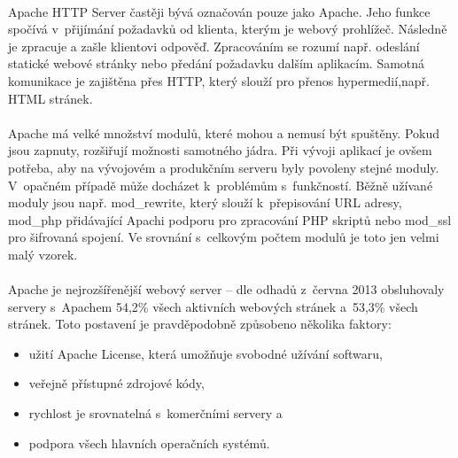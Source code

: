 \documentclass[11pt,a4paper,titlepage,oneside]{book}
\begin{document}


		\paragraph{} Apache HTTP Server častěji bývá označován pouze jako Apache. Jeho funkce spočívá v~přijímání požadavků od klienta, kterým je webový prohlížeč. Následně je zpracuje a zašle klientovi odpověď. Zpracováním se rozumí např. odeslání statické webové stránky nebo předání požadavku dalším aplikacím. Samotná komunikace je zajištěna přes \ac{HTTP}, který slouží pro přenos hypermedií\cite{rfc2616},např. \ac{HTML} stránek.
		\paragraph{}Apache má velké množství modulů, které mohou a nemusí být spuštěny. Pokud jsou zapnuty, rozšiřují možnosti samotného jádra. Při vývoji aplikací je ovšem potřeba, aby na vývojovém a produkčním serveru byly povoleny stejné moduly. V~opačném případě může docházet k~problémům s~funkčností. Běžně užívané moduly jsou např. mod\_rewrite, který slouží k~přepisování URL adresy, mod\_php přidávající Apachi podporu pro zpracování PHP skriptů nebo mod\_ssl pro šifrovaná spojení. Ve srovnání s~celkovým počtem modulů je toto jen velmi malý vzorek.



		\paragraph{}\label{sec:marketShare} Apache je nejrozšířenější webový server -- dle odhadů\cite{netcraft_survey} z~června 2013 obsluhovaly servery s~Apachem 54,2\% všech aktivních webových stránek a~53,3\% všech stránek. Toto postavení je pravděpodobně způsobeno několika faktory:
		\begin{itemize}
			\item užití Apache License, která umožňuje svobodné užívání softwaru,
			\item veřejně přístupné zdrojové kódy,
			\item rychlost je srovnatelná s~komerčními servery a 
			\item podpora všech hlavních operačních systémů.
		\end{itemize}
		
\end{document}
